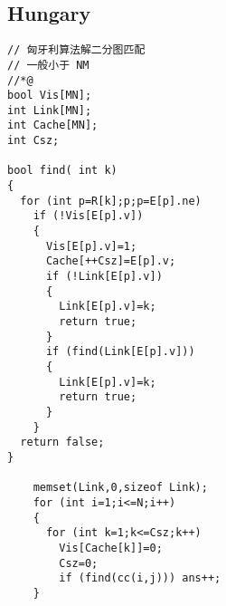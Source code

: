 \subsection{Hungary}
\begin{lstlisting}[language={}]
// 匈牙利算法解二分图匹配
// 一般小于 NM
//*@
bool Vis[MN];
int Link[MN];
int Cache[MN];
int Csz;

bool find( int k)
{
  for (int p=R[k];p;p=E[p].ne)
    if (!Vis[E[p].v])
    {
      Vis[E[p].v]=1;
      Cache[++Csz]=E[p].v;
      if (!Link[E[p].v])
      {
        Link[E[p].v]=k;
        return true;  
      }
      if (find(Link[E[p].v]))
      {
        Link[E[p].v]=k;
        return true;
      }
    }
  return false;
}

    memset(Link,0,sizeof Link);
    for (int i=1;i<=N;i++)
    {
      for (int k=1;k<=Csz;k++)
        Vis[Cache[k]]=0;
        Csz=0;
        if (find(cc(i,j))) ans++;
    }
\end{lstlisting}
